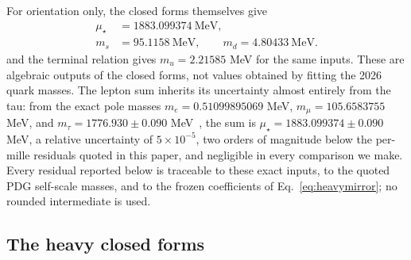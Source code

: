\documentclass[aps,twocolumn,superscriptaddress,nofootinbib,floatfix]{revtex4-2}
\newcommand{\mstar}{\mu_\star}
\begin{document}
For orientation only, the closed forms themselves give
\begin{align}
\mstar&=1883.099374\ \mathrm{MeV},\nonumber\\
m_s&=95.1158\ \mathrm{MeV},\qquad
m_d=4.80433\ \mathrm{MeV}.
\end{align}
and the terminal relation gives $m_u=2.21585$ MeV for the same inputs. These are algebraic outputs of the closed forms, not values obtained by fitting the 2026 quark masses. The lepton sum inherits its uncertainty almost entirely from the tau: from the exact pole masses $m_e=0.51099895069$ MeV, $m_\mu=105.6583755$ MeV, and $m_\tau=1776.930\pm0.090$ MeV~\cite{PDG2026}, the sum is $\mstar=1883.099374\pm0.090$ MeV, a relative uncertainty of $5\times10^{-5}$, two orders of magnitude below the per-mille residuals quoted in this paper, and negligible in every comparison we make. Every residual reported below is traceable to these exact inputs, to the quoted PDG self-scale masses, and to the frozen coefficients of Eq.~\eqref{eq:heavymirror}; no rounded intermediate is used.

\subsection{The heavy closed forms}
\label{sec:heavymirror}
\end{document}
